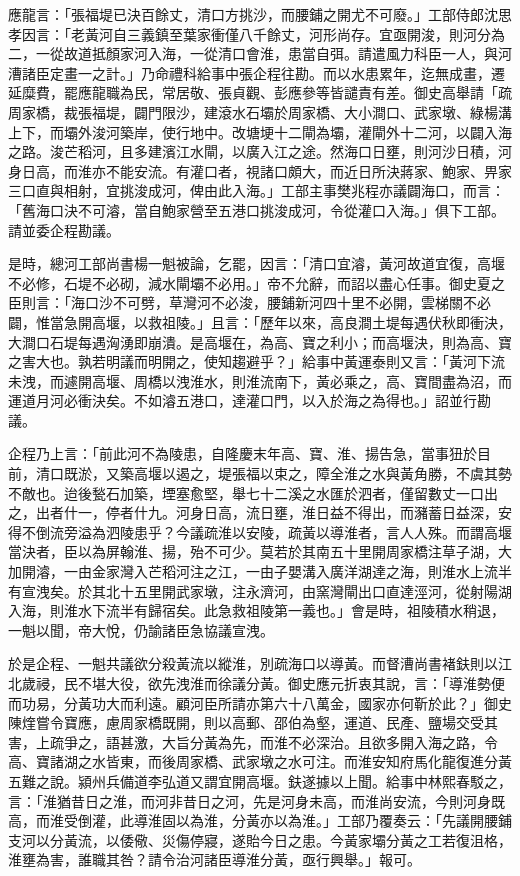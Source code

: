 應龍言：「張福堤已決百餘丈，清口方挑沙，而腰鋪之開尤不可廢。」工部侍郎沈思孝因言：「老黃河自三義鎮至葉家衝僅八千餘丈，河形尚存。宜亟開浚，則河分為二，一從故道抵顏家河入海，一從清口會淮，患當自弭。請遣風力科臣一人，與河漕諸臣定畫一之計。」乃命禮科給事中張企程往勘。而以水患累年，迄無成畫，遷延糜費，罷應龍職為民，常居敬、張貞觀、彭應參等皆譴責有差。御史高舉請「疏周家橋，裁張福堤，闢門限沙，建滾水石壩於周家橋、大小澗口、武家墩、綠楊溝上下，而壩外浚河築岸，使行地中。改塘埂十二閘為壩，灌閘外十二河，以闢入海之路。浚芒稻河，且多建濱江水閘，以廣入江之途。然海口日壅，則河沙日積，河身日高，而淮亦不能安流。有灌口者，視諸口頗大，而近日所決蔣家、鮑家、畀家三口直與相射，宜挑浚成河，俾由此入海。」工部主事樊兆程亦議闢海口，而言：「舊海口決不可濬，當自鮑家營至五港口挑浚成河，令從灌口入海。」俱下工部。請並委企程勘議。

是時，總河工部尚書楊一魁被論，乞罷，因言：「清口宜濬，黃河故道宜復，高堰不必修，石堤不必砌，減水閘壩不必用。」帝不允辭，而詔以盡心任事。御史夏之臣則言：「海口沙不可劈，草灣河不必浚，腰鋪新河四十里不必開，雲梯關不必闢，惟當急開高堰，以救祖陵。」且言：「歷年以來，高良澗土堤每遇伏秋即衝決，大澗口石堤每遇洶湧即崩潰。是高堰在，為高、寶之利小；而高堰決，則為高、寶之害大也。孰若明議而明開之，使知趨避乎？」給事中黃運泰則又言：「黃河下流未洩，而遽開高堰、周橋以洩淮水，則淮流南下，黃必乘之，高、寶間盡為沼，而運道月河必衝決矣。不如濬五港口，達灌口門，以入於海之為得也。」詔並行勘議。

企程乃上言：「前此河不為陵患，自隆慶末年高、寶、淮、揚告急，當事狃於目前，清口既淤，又築高堰以遏之，堤張福以束之，障全淮之水與黃角勝，不虞其勢不敵也。迨後甃石加築，堙塞愈堅，舉七十二溪之水匯於泗者，僅留數丈一口出之，出者什一，停者什九。河身日高，流日壅，淮日益不得出，而瀦蓄日益深，安得不倒流旁溢為泗陵患乎？今議疏淮以安陵，疏黃以導淮者，言人人殊。而謂高堰當決者，臣以為屏翰淮、揚，殆不可少。莫若於其南五十里開周家橋注草子湖，大加開濬，一由金家灣入芒稻河注之江，一由子嬰溝入廣洋湖達之海，則淮水上流半有宣洩矣。於其北十五里開武家墩，注永濟河，由窯灣閘出口直達涇河，從射陽湖入海，則淮水下流半有歸宿矣。此急救祖陵第一義也。」會是時，祖陵積水稍退，一魁以聞，帝大悅，仍諭諸臣急協議宣洩。

於是企程、一魁共議欲分殺黃流以縱淮，別疏海口以導黃。而督漕尚書褚鈇則以江北歲祲，民不堪大役，欲先洩淮而徐議分黃。御史應元折衷其說，言：「導淮勢便而功易，分黃功大而利遠。顧河臣所請亦第六十八萬金，國家亦何靳於此？」御史陳煃嘗令寶應，慮周家橋既開，則以高郵、邵伯為壑，運道、民產、鹽場交受其害，上疏爭之，語甚激，大旨分黃為先，而淮不必深治。且欲多開入海之路，令高、寶諸湖之水皆東，而後周家橋、武家墩之水可注。而淮安知府馬化龍復進分黃五難之說。潁州兵備道李弘道又謂宜開高堰。鈇遂據以上聞。給事中林熙春駁之，言：「淮猶昔日之淮，而河非昔日之河，先是河身未高，而淮尚安流，今則河身既高，而淮受倒灌，此導淮固以為淮，分黃亦以為淮。」工部乃覆奏云：「先議開腰鋪支河以分黃流，以倭儆、災傷停寢，遂貽今日之患。今黃家壩分黃之工若復沮格，淮壅為害，誰職其咎？請令治河諸臣導淮分黃，亟行興舉。」報可。

